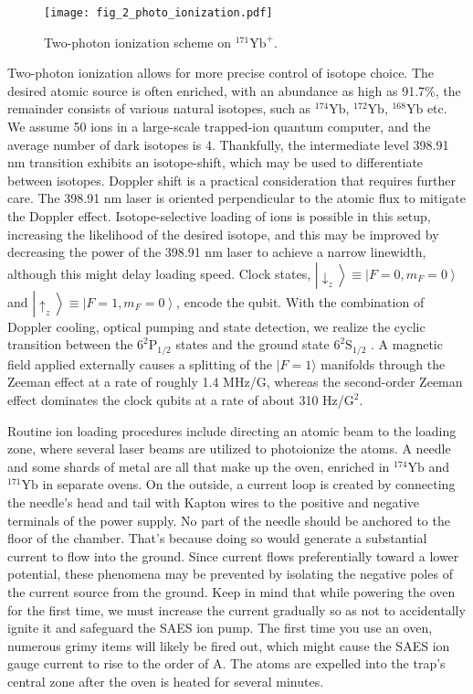 \begin{figure}
    \centering
    \texttt{[image: fig\_2\_photo\_ionization.pdf]}
    \caption{Two-photon ionization scheme on ${ }^{171} \mathrm{Yb}^{+}$.}
    \label{fig:photo_ionization}
\end{figure}

Two-photon ionization allows for more precise control of isotope choice. The desired atomic source is often enriched, with an abundance as high as 91.7\%, the remainder consists of various natural isotopes, such as ${ }^{174} \mathrm{Yb}$, ${ }^{172} \mathrm{Yb}$, ${ }^{168} \mathrm{Yb}$ etc. We assume 50 ions in a large-scale trapped-ion quantum computer, and the average number of dark isotopes is 4. Thankfully, the intermediate level 398.91 nm transition exhibits an isotope-shift, which may be used to differentiate between isotopes. Doppler shift is a practical consideration that requires further care. The 398.91 nm laser is oriented perpendicular to the atomic flux to mitigate the Doppler effect. Isotope-selective loading of ions is possible in this setup, increasing the likelihood of the desired isotope, and this may be improved by decreasing the power of the 398.91 nm laser to achieve a narrow linewidth, although this might delay loading speed. Clock states, $\left|\downarrow_z\right\rangle \equiv\left|F=0, m_F=0\right\rangle$ and $\left|\uparrow_z\right\rangle \equiv\left|F=1, m_F=0\right\rangle$, encode the qubit. With the combination of Doppler cooling, optical pumping and state detection, we realize the cyclic transition between the $6^2 \mathrm{P}_{1 / 2}$ states and the ground state $6^2 \mathrm{S}_{1 / 2}$ \cite{RN218}. A magnetic field applied externally causes a splitting of the $|F=1\rangle$ manifolds through the Zeeman effect at a rate of roughly 1.4 MHz/G, whereas the second-order Zeeman effect dominates the clock qubits at a rate of about 310 Hz/$\mathrm{G}^2$.

Routine ion loading procedures include directing an atomic beam to the loading zone, where several laser beams are utilized to photoionize the atoms. A needle and some shards of metal are all that make up the oven, enriched in ${ }^{174} \mathrm{Yb}$ and ${ }^{171} \mathrm{Yb}$ in separate ovens. On the outside, a current loop is created by connecting the needle's head and tail with Kapton wires to the positive and negative terminals of the power supply. No part of the needle should be anchored to the floor of the chamber. That's because doing so would generate a substantial current to flow into the ground. Since current flows preferentially toward a lower potential, these phenomena may be prevented by isolating the negative poles of the current source from the ground. Keep in mind that while powering the oven for the first time, we must increase the current gradually so as not to accidentally ignite it and safeguard the SAES ion pump. The first time you use an oven, numerous grimy items will likely be fired out, which might cause the SAES ion gauge current to rise to the order of A. The atoms are expelled into the trap's central zone after the oven is heated for several minutes.

